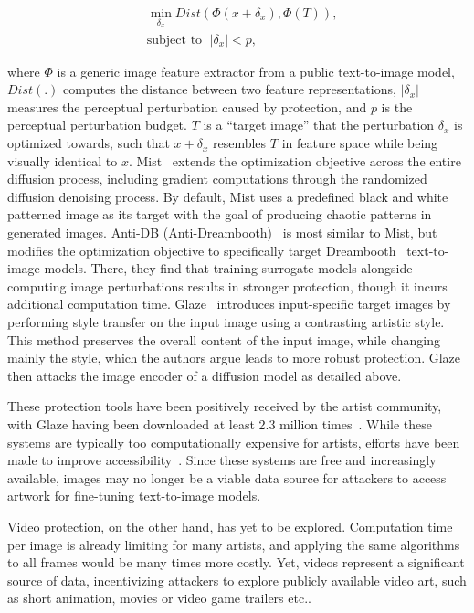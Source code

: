 \secspace
\begin{eqnarray}
   &\min\limits_{\delta_x} Dist\left( \Phi(x + \delta_x), \Phi(T)\right),  \label{eq:cloakopt}\\
  & \text{subject to } \; |\delta_x|< p, \nonumber
\end{eqnarray} 

where $\Phi$ is a generic image feature extractor from a public text-to-image model, $Dist(.)$ computes the distance between two feature representations, $|\delta_x|$ measures the perceptual perturbation caused by protection, and $p$ is the perceptual perturbation budget. $T$ is 
a ``target image'' that the perturbation $\delta_x$ is optimized towards, such that $x + 
\delta_x$ resembles $T$ in feature space while being visually identical to $x$. Mist~\cite{mist} extends the optimization objective across the entire diffusion process, including gradient computations through the randomized diffusion denoising process. By default, Mist uses a predefined black and white patterned image as its target with the goal of producing chaotic patterns in generated images. Anti-DB (Anti-Dreambooth)~\cite{antidb} is most similar to Mist, but modifies the optimization objective to specifically target Dreambooth~\cite{ruiz2022dreambooth} text-to-image models. There, they find that training surrogate models alongside computing image perturbations results in stronger protection, though it incurs additional computation time. Glaze~\cite{shan2023glaze} introduces input-specific target images by performing style transfer on the input image using a contrasting artistic style. This method preserves the overall content of the input image, while changing mainly the style, which the authors argue leads to more robust protection. Glaze then attacks the image encoder of a diffusion model as detailed above. 

These protection tools have been positively received by the artist community,
with Glaze having been downloaded at least 2.3 million
times~\cite{shan2023glazewebsite}. While these systems are typically too
computationally expensive for artists, efforts have been made to improve
accessibility~\cite{mistgithub, shan2023webglaze}. Since these systems are
free and increasingly available, images may no longer be a viable data source
for attackers to access artwork for fine-tuning text-to-image models. 

Video protection, on the other hand, has yet to be explored. Computation time per image is already limiting for many artists, and applying the same algorithms to all frames would be many times more costly. Yet, videos represent a significant source of data, incentivizing attackers to explore publicly available video art, such as short animation, movies or video game trailers etc..

